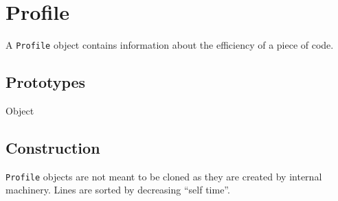 
\section{Profile}

A \lstinline|Profile| object contains information about the efficiency of a
piece of code.

\subsection{Prototypes}

\begin{refObjects}
\item[Object]
\end{refObjects}

\subsection{Construction}

\lstinline|Profile| objects are not meant to be cloned as they are created
by  internal machinery. Lines are sorted by
decreasing ``self time''.

